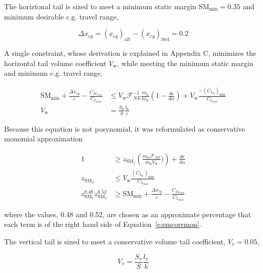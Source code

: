 \documentclass[]{aiaa-tc}%
\begin{document}
The horiztonal tail is sized to meet a minimum static margin $\text{SM}_{\text{min}} = 0.35$ and minimum desirable c.g. travel range,

\begin{equation}
    \label{e:deltacg}
    \Delta x_{cg} = (x_{cg})_{\text{aft}} - (x_{cg})_{\text{fwd}} = 0.2
\end{equation}

A single constraint, whose derivation is explained in Appendix C, minimizes the horizontal tail volume coefficient $V_{\text{w}}$, while meeting the minimum static margin and minimum c.g. travel range,

\begin{align}
    \label{e:smcorr}
    \text{SM}_{\text{min}} + \frac{\Delta x_{cg}}{c} - \frac{C_{M_{	ext{w}}}}{C_{L_{\text{max}}}} &\leq V_{\text{w}} \mathcal{F}_{NE}^{-1} \frac{m_{\text{h}}}{m_{\text{w}}} \left( 1 - \frac{d\epsilon}{d\alpha}\right) + V_{\text{w}} \frac{-(C_{L_{\text{h}}})_{\text{min}}}{C_{L_{\text{max}}}} \\
    \label{e:htv}
    V_{\text{w}} &= \frac{S_{\text{h}}}{S} \frac{l_{\text{h}}}{c}
\end{align}

Because this equation is not posynomial, it was reformulated as conservative monomial approximation

\begin{align}
    1 &\geq z_{\text{SM}_1} \left(\frac{m_{\text{w}} \mathcal{F}_{NE}}{m_{\text{h}} V_{\text{w}}})\right) + \frac{d\epsilon}{d\alpha} \\
    z_{\text{SM}_2} &\leq V_{\text{w}}\frac{(C_{L_{\text{h}}})_{\text{min}}}{C_{L_{\text{max}}}} \\
    \label{e:smcorrmon}
    z_{\text{SM}_1}^{0.48} z_{\text{SM}_1}^{0.52} &\geq \text{SM}_{\text{min}} + \frac{\Delta x_{cg}}{c} - \frac{C_{M_{	ext{w}}}}{C_{L_{\text{max}}}}
\end{align}

where the values, 0.48 and 0.52, are chosen as an approximate percentage that each term is of the right hand side of Equation~\eqref{e:smcorrmon}. 

The vertical tail is sized to meet a conservative volume tail coefficient, $V_{\text{v}}= 0.05$,\cite{aircraftrules}

\begin{equation}
    \label{e:vtv}
    V_{\text{v}} = \frac{S_{\text{v}}}{S} \frac{l_{\text{v}}}{b}
\end{equation}
\end{document}
